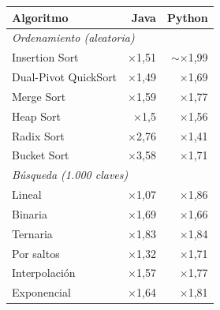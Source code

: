 {\small
\begin{tabular}{lrr}
\toprule
Algoritmo & Java & Python \\
\midrule
\multicolumn{3}{l}{\textit{Ordenamiento (aleatoria)}} \\
Insertion Sort & $\times$1,51 & $\sim$$\times$1,99 \\
Dual-Pivot QuickSort & $\times$1,49 & $\times$1,69 \\
Merge Sort & $\times$1,59 & $\times$1,77 \\
Heap Sort & $\times$1,5 & $\times$1,56 \\
Radix Sort & $\times$2,76 & $\times$1,41 \\
Bucket Sort & $\times$3,58 & $\times$1,71 \\
\multicolumn{3}{l}{\textit{B\'usqueda (1.000 claves)}} \\
Lineal & $\times$1,07 & $\times$1,86 \\
Binaria & $\times$1,69 & $\times$1,66 \\
Ternaria & $\times$1,83 & $\times$1,84 \\
Por saltos & $\times$1,32 & $\times$1,71 \\
Interpolaci\'on & $\times$1,57 & $\times$1,77 \\
Exponencial & $\times$1,64 & $\times$1,81 \\
\bottomrule
\end{tabular}}\par
